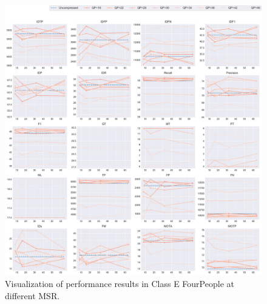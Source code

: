 \begin{figure}[!htbp]
\centering
\includegraphics[width=1.0\linewidth]{img/appendix/FourPeople_all_multiplots_msr.pdf}
\caption[Visualization of performance results in Class E FourPeople at different MSR]
{Visualization of performance results in Class E FourPeople at different MSR.}
\label{fig:FourPeople_all_msr}
\end{figure}



